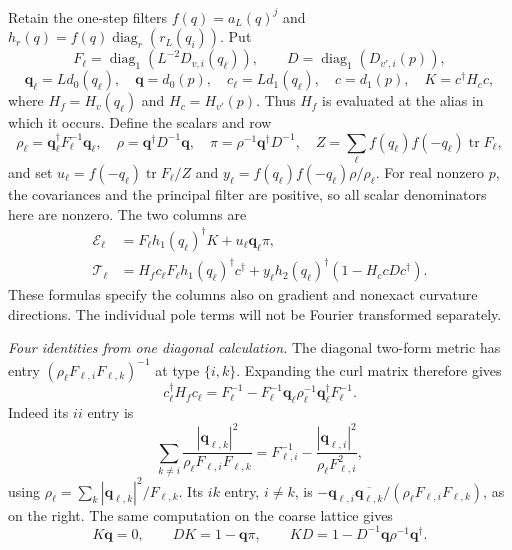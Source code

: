 \documentclass[11pt,reqno]{amsart}
\numberwithin{equation}{section}
\theoremstyle{definition}
\theoremstyle{remark}
\DeclareMathOperator{\tr}{tr}
\begin{document}
Retain the one-step filters \(f(q)=a_L(q)^j\) and
\(h_r(q)=f(q)\operatorname{diag}_r(r_L(q_i))\). Put
\[
 F_\ell=\operatorname{diag}_1(L^{-2}D_{v,i}(q_\ell)),\qquad
 D=\operatorname{diag}_1(D_{v',i}(p)),
\]
\[
 \mathbf q_\ell=Ld_0(q_\ell),\quad \mathbf q=d_0(p),\quad
 c_\ell=Ld_1(q_\ell),\quad c=d_1(p),\quad K=c^\dagger H_cc,
\]
where \(H_f=H_v(q_\ell)\) and \(H_c=H_{v'}(p)\). Thus
\(H_f\) is evaluated at the alias in which it occurs.
Define the scalars and row
\[
 \rho_\ell=\mathbf q_\ell^\dagger F_\ell^{-1}\mathbf q_\ell,
 \quad \rho=\mathbf q^\dagger D^{-1}\mathbf q,
 \quad \pi=\rho^{-1}\mathbf q^\dagger D^{-1},
 \quad Z=\sum_\ell f(q_\ell)f(-q_\ell)\tr F_\ell,
\]
and set \(u_\ell=f(-q_\ell)\tr F_\ell/Z\) and
\(y_\ell=f(q_\ell)f(-q_\ell)\rho/\rho_\ell\).
For real nonzero \(p\), the covariances and the principal
filter are positive, so all scalar denominators here are
nonzero. The two columns are
\begin{align}
 \mathcal E_\ell&=F_\ell h_1(q_\ell)^\dagger K
                                      +u_\ell\mathbf q_\ell\pi,
 \label{eq:calibration-E-alias}\\
 \mathcal T_\ell&=H_fc_\ell F_\ell h_1(q_\ell)^\dagger c^\dagger
             +y_\ell h_2(q_\ell)^\dagger(1-H_ccDc^\dagger).
 \label{eq:calibration-T-alias}
\end{align}
These formulas specify the columns also on gradient and
nonexact curvature directions. The individual pole terms
will not be Fourier transformed separately.

\smallskip\noindent
\emph{Four identities from one diagonal calculation.}
The diagonal two-form metric has entry
\((\rho_\ell F_{\ell,i}F_{\ell,k})^{-1}\) at type
\(\{i,k\}\). Expanding the curl matrix therefore gives
\begin{equation}
 c_\ell^\dagger H_fc_\ell
 =F_\ell^{-1}-F_\ell^{-1}\mathbf q_\ell\rho_\ell^{-1}
                                      \mathbf q_\ell^\dagger F_\ell^{-1}.
 \label{eq:calibration-Maxwell-identity}
\end{equation}
Indeed its \(ii\) entry is
\[
 \sum_{k\ne i}\frac{|\mathbf q_{\ell,k}|^2}
                         {\rho_\ell F_{\ell,i}F_{\ell,k}}
     =F_{\ell,i}^{-1}
                -\frac{|\mathbf q_{\ell,i}|^2}{\rho_\ell F_{\ell,i}^2},
\]
using \(\rho_\ell=\sum_k|\mathbf q_{\ell,k}|^2/F_{\ell,k}\).
Its \(ik\) entry, \(i\ne k\), is
\(-\mathbf q_{\ell,i}\overline{\mathbf q_{\ell,k}}/
(\rho_\ell F_{\ell,i}F_{\ell,k})\), as on the right.
The same computation on the coarse lattice gives
\begin{equation}
 K\mathbf q=0,\qquad DK=1-\mathbf q\pi,\qquad
                 KD=1-D^{-1}\mathbf q\rho^{-1}\mathbf q^\dagger.
 \label{eq:calibration-coarse-projectors}
\end{equation}
\end{document}
